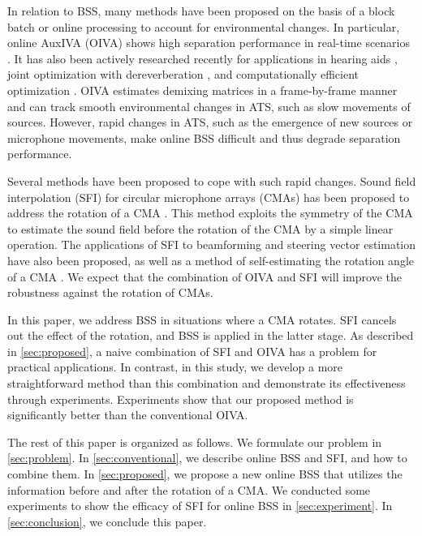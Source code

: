 \documentclass[sip,biber]{now-journal}
\begin{document}
In relation to BSS, many methods have been proposed on the basis of a block batch \cite{Koldovsky:2019:ICASSP,Koldovsky:2021:SP,Jansky:2022:ASMP} or online processing \cite{Kim:2010:CASI,Taniguchi:2014:HSCMA} to account for environmental changes.
In particular, online AuxIVA (OIVA) shows high separation performance in real-time scenarios \cite{Taniguchi:2014:HSCMA}.
It has also been actively researched recently for applications in hearing aids \cite{Sunohara:2017:ICASSP}, joint optimization with dereverberation \cite{Ueda:2021:ICASSP}, and computationally efficient optimization \cite{Nakashima:2023:ICASSP}.
OIVA estimates demixing matrices in a frame-by-frame manner and can track smooth environmental changes in ATS, such as slow movements of sources.
However, rapid changes in ATS, such as the emergence of new sources or microphone movements, make online BSS difficult and thus degrade separation performance.

Several methods have been proposed to cope with such rapid changes.
Sound field interpolation (SFI) for circular microphone arrays (CMAs) has been proposed to address the rotation of a CMA \cite{Wakabayashi:2023:ASLP}.
This method exploits the symmetry of the CMA to estimate the sound field before the rotation of the CMA by a simple linear operation.
The applications of SFI to beamforming \cite{Wakabayashi:2021:ICASSP} and steering vector estimation \cite{Wakabayashi:2021:ASJ:A} have also been proposed,
as well as a method of self-estimating the rotation angle of a CMA \cite{Lian:2021:APSIPA}.
We expect that the combination of OIVA and SFI will improve the robustness against the rotation of CMAs.

In this paper, we address BSS in situations where a CMA rotates.
SFI cancels out the effect of the rotation, and BSS is applied in the latter stage.
As described in \cref{sec:proposed}, a naive combination of SFI and OIVA has a problem for practical applications.
In contrast, in this study, we develop a more straightforward method than this combination and demonstrate its effectiveness through experiments.
Experiments show that our proposed method is significantly better than the conventional OIVA.

The rest of this paper is organized as follows.
We formulate our problem in \cref{sec:problem}.
In \cref{sec:conventional}, we describe online BSS and SFI, and how to combine them.
In \cref{sec:proposed}, we propose a new online BSS that utilizes the information before and after the rotation of a CMA.
We conducted some experiments to show the efficacy of SFI for online BSS in \cref{sec:experiment}.
In \cref{sec:conclusion}, we conclude this paper.
\end{document}
